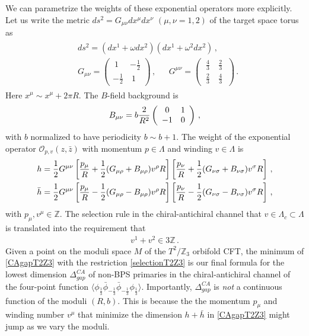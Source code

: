 \documentclass[12pt]{article}
\begin{document}
We can parametrize the weights of these exponential operators more explicitly.  
Let us write the metric $ds^2 = G_{\mu\nu}dx^\mu dx^\nu$ $(\mu,\nu=1,2)$ of the target space torus  as
\begin{align}
\begin{split}
&ds^2 =  (dx^1 + \omega dx^2 ) (dx^1 +\omega^2 dx^2 )\,,\\
&G_{\mu\nu} = \left(\begin{array}{cc}~1 ~& -\frac12 \\-\frac12 & ~1~\end{array}\right)\,,~~~~~~~
G^{\mu\nu} = \left(\begin{array}{cc}~\frac43~ & \frac23~ \\ ~\frac23~ & \frac43~\end{array}\right)\,.
\end{split}
\end{align}
Here $x^\mu \sim x^\mu +2\pi R$. 
The $B$-field background is
\begin{align}
B_{\mu\nu} =b{2\over R^2}  \left(\begin{array}{cc}0 & 1 \\-1 & 0\end{array}\right)\,,
\end{align}
with $b$ normalized to have periodicity $b\sim b+1$.  The weight of the exponential operator $\mathcal{O}_{p,v}(z,\bar z)$ with momentum $p\in \Lambda$ and winding $v\in \Lambda$ is
\begin{align}
\begin{split}\label{CAgapT2Z3}
&h   = \frac12 G^{\mu\nu} \left[  { p_\mu \over R}+ \frac12 (  G_{\mu\rho} +B_{\mu\rho}) v^\rho R\right]\left[ { p_\nu \over R}+  \frac12  (  G_{\nu\sigma} +B_{\nu\sigma}) v^\sigma R\right]\,,\\
&\bar h  = \frac12 G^{\mu\nu} \left[ { p_\mu \over R}-  \frac12  (  G_{\mu\rho} -B_{\mu\rho}) v^\rho R\right]\left[ { p_\nu \over R}-  \frac12 (  G_{\nu\sigma} -B_{\nu\sigma}) v^\sigma R\right]\,,
\end{split}
\end{align} 
 with $p_\mu, v^\mu \in \mathbb{Z}$.  
The selection rule in the chiral-antichiral channel that $v\in \Lambda_c \subset \Lambda$ is translated into the requirement that
\begin{align}\label{selectionT2Z3}
v^1+v^2 \in 3\mathbb{Z}\,.
\end{align}
Given a point on the moduli space $M$  of the $T^2/\mathbb{Z}_3$ orbifold CFT, the minimum of \eqref{CAgapT2Z3} with the restriction \eqref{selectionT2Z3} is our final formula  for the lowest dimension  $\Delta^{CA}_{gap}$  of non-BPS primaries in the chiral-antichiral channel of the four-point function $\langle \phi_{\frac13} \bar \phi_{-\frac13} \bar \phi_{-\frac13} \phi_{\frac13}\rangle$. Importantly, $\Delta^{CA}_{gap}$ is \textit{not} a continuous function of the moduli $(R,b)$. This is because the  the momentum $p_\mu$ and winding number $v^\mu$ that minimize the dimension $h+\bar h$ in \eqref{CAgapT2Z3}  might jump  as we vary the moduli.
\end{document}
